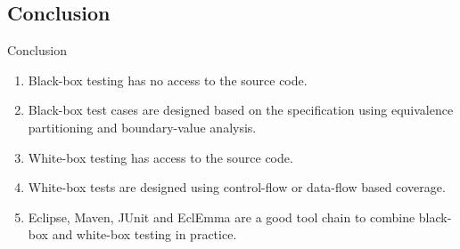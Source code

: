 \subsection*{Conclusion}

\begin{frame}{Conclusion}
  \begin{enumerate}
    \item \alert{Black-box testing} has \alert{no access} to the source code.
    \item Black-box test cases are designed based on the \alert{specification} using \alert{equivalence partitioning} and \alert{boundary-value analysis}.
    \item \alert{White-box testing} has \alert{access} to the source code.
    \item White-box tests are designed using \alert{control-flow} or \alert{data-flow based coverage}.
    \item \alert{Eclipse, Maven, JUnit and EclEmma} are a good tool chain to \alert{combine black-box and white-box testing} in practice.
  \end{enumerate}
\end{frame}